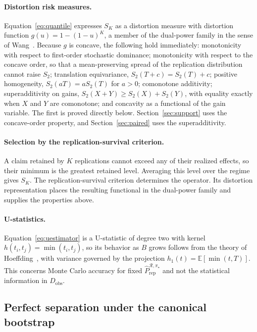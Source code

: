 \documentclass[11pt]{article}
\newcommand{\Regime}{\mathcal{R}}
\newcommand{\E}{\mathbb{E}}
\newcommand{\PRepHat}{\widehat{P}_{\mathrm{rep}}^{\Regime,\pi_\star}}
\theoremstyle{remark}
\begin{document}
\paragraph{Distortion risk measures.}
Equation~\eqref{eq:quantile} expresses $S_K$ as a distortion measure with distortion function $g(u)=1-(1-u)^{K}$, a member of the dual-power family in the sense of Wang~\cite{wang1996premium}. Because $g$ is concave, the following hold immediately: monotonicity with respect to first-order stochastic dominance; monotonicity with respect to the concave order, so that a mean-preserving spread of the replication distribution cannot raise $S_2$; translation equivariance, $S_2(T+c)=S_2(T)+c$; positive homogeneity, $S_2(aT)=aS_2(T)$ for $a>0$; comonotone additivity; superadditivity on gains, $S_2(X+Y)\geq S_2(X)+S_2(Y)$, with equality exactly when $X$ and $Y$ are comonotone; and concavity as a functional of the gain variable. The first is proved directly below. Section~\ref{sec:support} uses the concave-order property, and Section~\ref{sec:paired} uses the superadditivity.

\paragraph{Selection by the replication-survival criterion.}
A claim retained by $K$ replications cannot exceed any of their realized effects, so their minimum is the greatest retained level. Averaging this level over the regime gives $S_K$. The replication-survival criterion determines the operator. Its distortion representation places the resulting functional in the dual-power family and supplies the properties above.

\paragraph{U-statistics.}
Equation~\eqref{eq:uestimator} is a U-statistic of degree two with kernel $h(t_i,t_j)=\min(t_i,t_j)$, so its behavior as $B$ grows follows from the theory of Hoeffding~\cite{hoeffding1948ustat}, with variance governed by the projection $h_1(t)=\E[\min(t,T)]$. This concerns Monte Carlo accuracy for fixed $\PRepHat$ and not the statistical information in $D_{\mathrm{obs}}$.

\subsection{Perfect separation under the canonical bootstrap}
\label{app:fixed-point-proof}
\end{document}
